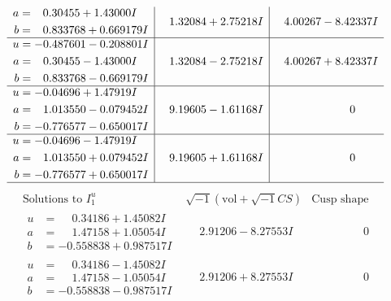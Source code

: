 \documentclass[1p]{elsarticle_modified}
\theoremstyle{definition}
\newcommand{\I}{\sqrt{-1}}
\begin{document}
$$\begin{array}{c|c|c}
\begin{aligned}
a &= \phantom{-}0.30455 + 1.43000 I \\
b &= \phantom{-}0.833768 + 0.669179 I\end{aligned}
 & \phantom{-}1.32084 + 2.75218 I & \phantom{-}4.00267 - 8.42337 I \\ \hline\begin{aligned}
u &= -0.487601 - 0.208801 I \\
a &= \phantom{-}0.30455 - 1.43000 I \\
b &= \phantom{-}0.833768 - 0.669179 I\end{aligned}
 & \phantom{-}1.32084 - 2.75218 I & \phantom{-}4.00267 + 8.42337 I \\ \hline\begin{aligned}
u &= -0.04696 + 1.47919 I \\
a &= \phantom{-}1.013550 - 0.079452 I \\
b &= -0.776577 - 0.650017 I\end{aligned}
 & \phantom{-}9.19605 - 1.61168 I & \phantom{-0.000000 } 0 \\ \hline\begin{aligned}
u &= -0.04696 - 1.47919 I \\
a &= \phantom{-}1.013550 + 0.079452 I \\
b &= -0.776577 + 0.650017 I\end{aligned}
 & \phantom{-}9.19605 + 1.61168 I & \phantom{-0.000000 } 0\\
 \hline 
 \end{array}$$\newpage$$\begin{array}{c|c|c}  
\text{Solutions to }I^u_{1}& \I (\text{vol} + \sqrt{-1}CS) & \text{Cusp shape}\\
 \hline 
\begin{aligned}
u &= \phantom{-}0.34186 + 1.45082 I \\
a &= \phantom{-}1.47158 + 1.05054 I \\
b &= -0.558838 + 0.987517 I\end{aligned}
 & \phantom{-}2.91206 - 8.27553 I & \phantom{-0.000000 } 0 \\ \hline\begin{aligned}
u &= \phantom{-}0.34186 - 1.45082 I \\
a &= \phantom{-}1.47158 - 1.05054 I \\
b &= -0.558838 - 0.987517 I\end{aligned}
 & \phantom{-}2.91206 + 8.27553 I & \phantom{-0.000000 } 0 \\ \hline\begin{aligned}

\end{aligned}
\end{array}$$
\end{document}
